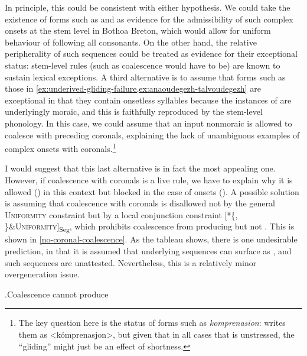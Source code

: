In principle, this could be consistent with either hypothesis. We could take the existence of forms such as \ipa{[komprəˈnasion]} and \ipa{[ˈtalfiæz̥]} as evidence for the admissibility of such complex onsets at the stem level in Bothoa Breton, which would allow for uniform behaviour of \ipa{[i]} following all consonants. On the other hand, the relative peripherality of such sequences could be treated as evidence for their exceptional status: stem-level rules (such as coalescence would have to be) are known to sustain lexical exceptions. A third alternative is to assume that forms such as those in \cref{ex:underived-gliding-failure,ex:anaoudegezh-talvoudegezh} are exceptional in that they contain onsetless syllables because the instances of \ipa{[i]} are underlyingly moraic, and this is faithfully reproduced by the stem\hyp level phonology. In this case, we could assume that an input nonmoraic \ipa{[i]} is allowed to coalesce with preceding coronals, explaining the lack of unambiguous examples of complex \ipa{[Cj]} onsets with coronals.\footnote{The key question here is the status of forms such as \emph{komprenasion}: \citet{humphreys95:_phonol_bothoa_saint_nicol_pelem} writes them as <kómprenasjon>, but given that in all cases that \ipa{[i]} is unstressed, the \enquote{gliding} might just be an effect of shortness.}

I would suggest that this last alternative is in fact the most appealing one. However, if coalescence with coronals is a live rule, we have to explain why it is allowed () in this context but blocked in the case of \ipa{[kj]} onsets (). A possible solution is assuming that coalescence with coronals is disallowed not by the general \textsc{Uniformity} constraint but by a local conjunction constraint [*\{, \}\&\textsc{Uniformity}]\textsubscript{Seg}, which prohibits coalescence from producing \ipa{[ʧ~dʒ]} but not \ipa{[ʃ~ʒ~j̃\kern-1pt~j]}. This is shown in \cref{no-coronal-coalescence}. As the tableau shows, there is one undesirable prediction, in that it is assumed that underlying  sequences can surface as \ipa{[stjV]}, and such sequences are unattested. Nevertheless, this is a relatively minor overgeneration issue.

\ex.\label{no-coronal-coalescence}Coalescence cannot produce \ipa{[ʧ]}\\


